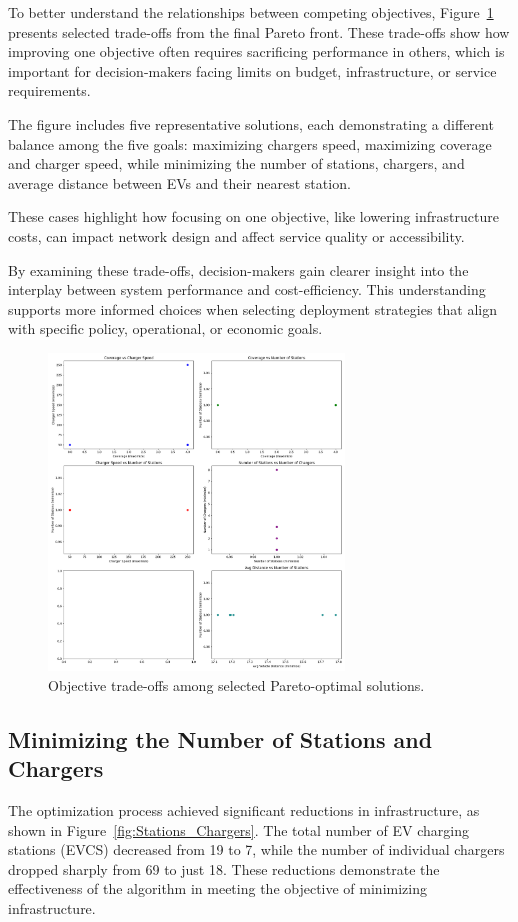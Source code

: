 To better understand the relationships between competing objectives, Figure~\ref{fig:trade_off} presents selected trade-offs from the final Pareto front. These trade-offs show how improving one objective often requires sacrificing performance in others, which is important for decision-makers facing limits on budget, infrastructure, or service requirements.

The figure includes five representative solutions, each demonstrating a different balance among the five goals: maximizing chargers speed, maximizing coverage and charger speed, while minimizing the number of stations, chargers, and average distance between EVs and their nearest station. 

These cases highlight how focusing on one objective, like lowering infrastructure costs, can impact network design and affect service quality or accessibility.

By examining these trade-offs, decision-makers gain clearer insight into the interplay between system performance and cost-efficiency. This understanding supports more informed choices when selecting deployment strategies that align with specific policy, operational, or economic goals.
\clearpage
\begin{figure}[h!]
    \centering
    \includegraphics[width=0.7\textwidth]{../Figures/Trade_Off.png}
    \caption{Objective trade-offs among selected Pareto-optimal solutions.}
    \label{fig:trade_off}
\end{figure}

\subsection{Minimizing the Number of Stations and Chargers}
The optimization process achieved significant reductions in infrastructure, as shown in Figure~\ref{fig:Stations_Chargers}. The total number of EV charging stations (EVCS) decreased from 19 to 7, while the number of individual chargers dropped sharply from 69 to just 18. These reductions demonstrate the effectiveness of the algorithm in meeting the objective of minimizing infrastructure.


